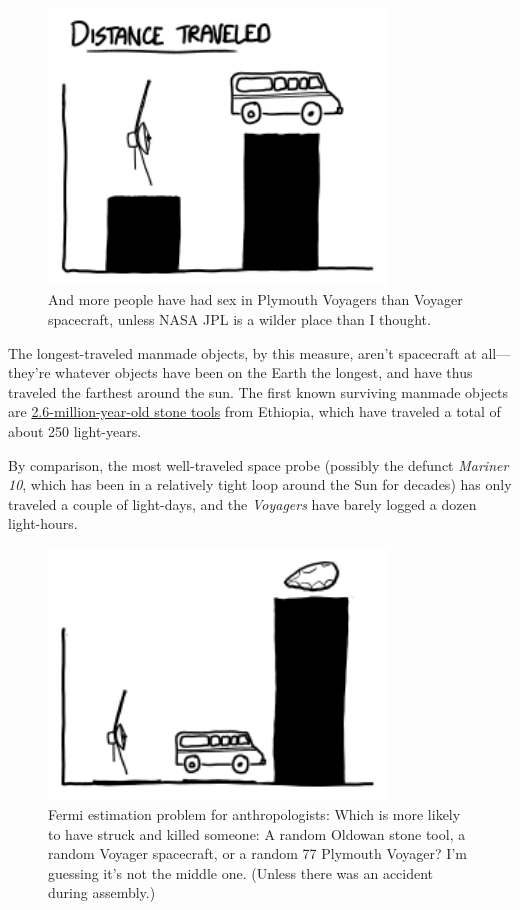 {\begin{figure}[!htbp]
\centering
\includegraphics[scale=0.5, max width=0.8\textwidth]{imgs/a/86/far_van.png}
\caption{And more people have had sex in Plymouth Voyagers than Voyager spacecraft, unless NASA JPL is a wilder place than I thought.}
\end{figure}

{The longest-traveled manmade objects, by this measure, aren't spacecraft at all—they're whatever objects have been on the Earth the longest, and have thus traveled the farthest around the sun. The first known surviving manmade objects are \href{http://www.sciencedirect.com/science/article/pii/S0047248403000939}{2.6-million-year-old stone tools} from Ethiopia, which have traveled a total of about 250 light-years.}

{By comparison, the most well-traveled space probe (possibly the defunct \emph{Mariner 10}, which has been in a relatively tight loop around the Sun for decades) has only traveled a couple of light-days, and the \emph{Voyagers} have barely logged a dozen light-hours.}

\begin{figure}[!htbp]
\centering
\includegraphics[scale=0.5, max width=0.8\textwidth]{imgs/a/86/far_tools.png}
\caption{Fermi estimation problem for anthropologists: Which is more likely to have struck and killed someone: A random Oldowan stone tool, a random Voyager spacecraft, or a random 77 Plymouth Voyager? I'm guessing it's not the middle one. (Unless there was an accident during assembly.)}
\end{figure}

}
